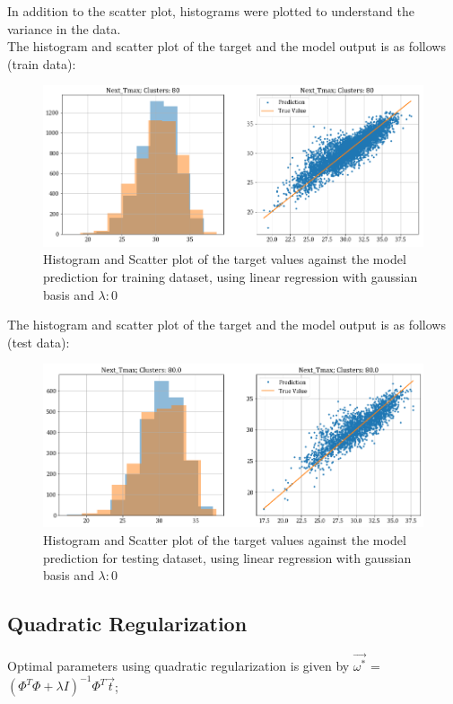 \documentclass[12pt,a4paper]{article}
\newcommand{\noi}{\noindent}
\begin{document}
\noi
In addition to the scatter plot, histograms were plotted to understand the variance in the data.\\

\noi
The histogram and scatter plot of the target and the model output is as follows (train data):
\begin{figure}[H]
     \centering
     \includegraphics[scale=0.49]{images/t3_d3/no_reg/T_max_nclu_80.png}
     \caption{Histogram and Scatter plot of the target values against the model prediction for training dataset, using linear regression with gaussian basis and $\lambda: 0$}
\end{figure}

\noi
The histogram and scatter plot of the target and the model output is as follows (test data):
\begin{figure}[H]
    \centering
    \includegraphics[scale=0.49]{images/t3_d3/no_reg/T_max_test.png}
    \caption{Histogram and Scatter plot of the target values against the model prediction for testing dataset, using linear regression with gaussian basis and $\lambda: 0$}
\end{figure}


\subsection{Quadratic Regularization}
Optimal parameters using quadratic regularization is given by $\vec{\omega^*}$ = $(\Phi^T\Phi + \lambda I)^{-1} \Phi^T \vec{t}$;\\
\end{document}
